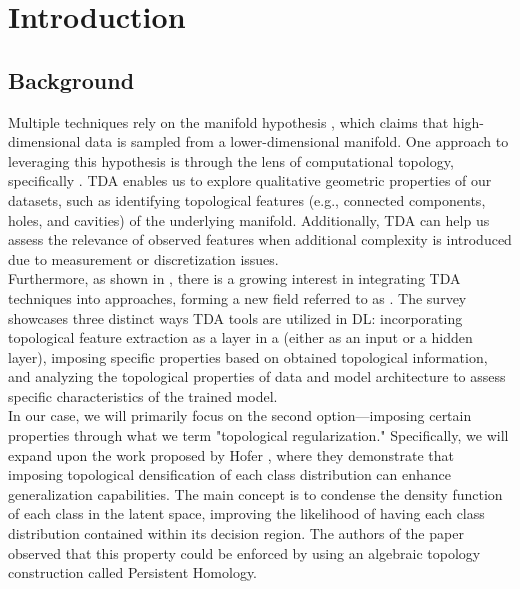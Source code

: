 \documentclass[../main.tex]{subfiles}
\begin{document}
\chapter{Introduction}
\label{ch:introduction}


\section{Background}
\label{sec:background}

Multiple  techniques rely on the manifold hypothesis \cite{fefferman_testing_2016}, which claims that high-dimensional data is sampled from a lower-dimensional manifold. One approach to leveraging this hypothesis is through the lens of computational topology, specifically . TDA enables us to explore qualitative geometric properties of our datasets, such as identifying topological features (e.g., connected components, holes, and cavities) of the underlying manifold. Additionally, TDA can help us assess the relevance of observed features when additional complexity is introduced due to measurement or discretization issues.\\

Furthermore, as shown in \cite{hensel_survey_2021}, there is a growing interest in integrating TDA techniques into  approaches, forming a new field referred to as . The survey showcases three distinct ways TDA tools are utilized in DL: incorporating topological feature extraction as a layer in a  (either as an input or a hidden layer), imposing specific properties based on obtained topological information, and analyzing the topological properties of data and model architecture to assess specific characteristics of the trained model.\\


In our case, we will primarily focus on the second option—imposing certain properties through what we term "topological regularization." Specifically, we will expand upon the work proposed by Hofer \etal \cite{hofer_densified_2021}, where they demonstrate that imposing topological densification of each class distribution can enhance generalization capabilities. The main concept is to condense the density function of each class in the latent space, improving the likelihood of having each class distribution contained within its decision region. The authors of the paper observed that this property could be enforced by using an algebraic topology construction called Persistent Homology.\\
\end{document}
